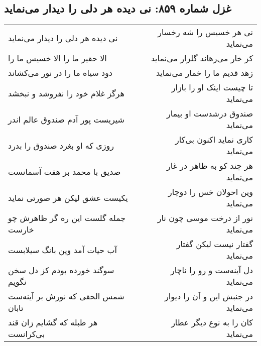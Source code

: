 \begin{center}
\section*{غزل شماره ۸۵۹: نی دیده هر دلی را دیدار می‌نماید}
\label{sec:0859}
\begin{longtable}{l p{0.5cm} r}
نی دیده هر دلی را دیدار می‌نماید
&&
نی هر خسیس را شه رخسار می‌نماید
\\
الا حقیر ما را الا خسیس ما را
&&
کز خار می‌رهاند گلزار می‌نماید
\\
دود سیاه ما را در نور می‌کشاند
&&
زهد قدیم ما را خمار می‌نماید
\\
هرگز غلام خود را نفروشد و نبخشد
&&
تا چیست اینک او را بازار می‌نماید
\\
شیریست پور آدم صندوق عالم اندر
&&
صندوق درشدست او بیمار می‌نماید
\\
روزی که او بغرد صندوق را بدرد
&&
کاری نماید اکنون بی‌کار می‌نماید
\\
صدیق با محمد بر هفت آسمانست
&&
هر چند کو به ظاهر در غار می‌نماید
\\
یکیست عشق لیکن هر صورتی نماید
&&
وین احولان خس را دوچار می‌نماید
\\
جمله گلست این ره گر ظاهرش چو خارست
&&
نور از درخت موسی چون نار می‌نماید
\\
آب حیات آمد وین بانگ سیلابست
&&
گفتار نیست لیکن گفتار می‌نماید
\\
سوگند خورده بودم کز دل سخن نگویم
&&
دل آینه‌ست و رو را ناچار می‌نماید
\\
شمس الحقی که نورش بر آینه‌ست تابان
&&
در جنبش این و آن را دیوار می‌نماید
\\
هر طبله که گشایم زان قند بی‌کرانست
&&
کان را به نوع دیگر عطار می‌نماید
\\
\end{longtable}
\end{center}
